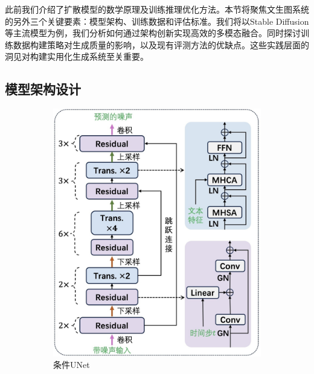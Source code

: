 \documentclass[11pt,a4paper,UTF8]{ctexart}
\begin{document}
此前我们介绍了扩散模型的数学原理及训练推理优化方法。本节将聚焦文生图系统的另外三个关键要素：模型架构、训练数据和评估标准。我们将以Stable Diffusion等主流模型为例，我们分析如何通过架构创新实现高效的多模态融合。同时探讨训练数据构建策略对生成质量的影响，以及现有评测方法的优缺点。这些实践层面的洞见对构建实用化生成系统至关重要。

\subsection{模型架构设计}
\label{sec:arch}

\begin{figure}[htbp]
    \centering
    \begin{subfigure}[b]{0.46\textwidth}
        \centering
        \includegraphics[width=\linewidth]{img/C-UNet.jpg}
        \caption{条件UNet}
        \label{fig:c-unet}
    \end{subfigure}
    \hfill
    \begin{subfigure}[b]{0.52\textwidth}
        \centering

\end{subfigure}
\end{figure}
\end{document}

